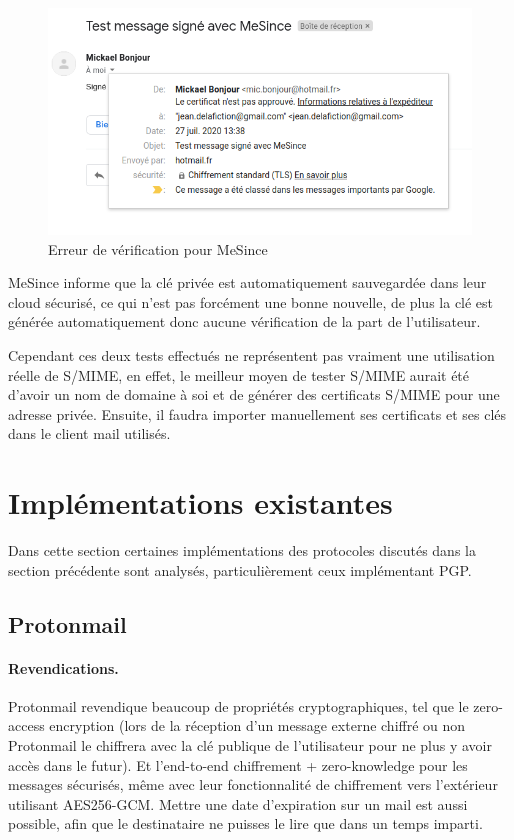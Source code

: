 \begin{figure}[h!]
	\includegraphics[width=15cm]{images/mesince_problem.png}
	\centering
	\caption{Erreur de vérification pour MeSince}
	\label{fig:SMIME_MeSinceProblem}
\end{figure}

MeSince informe que la clé privée est automatiquement sauvegardée dans leur cloud sécurisé, ce qui n'est pas forcément une bonne nouvelle, de plus la clé est générée automatiquement donc aucune vérification de la part de l'utilisateur.

Cependant ces deux tests effectués ne représentent pas vraiment une utilisation réelle de S/MIME, en effet, le meilleur moyen de tester S/MIME aurait été d'avoir un nom de domaine à soi et de générer des certificats S/MIME pour une adresse privée. Ensuite, il faudra importer manuellement ses certificats et ses clés dans le client mail utilisés.
\section{Implémentations existantes}
Dans cette section certaines implémentations des protocoles discutés dans la section précédente sont analysés, particulièrement ceux implémentant PGP.
\subsection{Protonmail}
\paragraph*{Revendications.}
Protonmail revendique beaucoup de propriétés cryptographiques, tel que le zero-access encryption (lors de la réception d'un message externe chiffré ou non Protonmail le chiffrera avec la clé publique de l'utilisateur pour ne plus y avoir accès dans le futur). Et l’end-to-end chiffrement + zero-knowledge pour les messages sécurisés, même avec leur fonctionnalité de chiffrement vers l'extérieur utilisant AES256-GCM. Mettre une date d'expiration sur un mail est aussi possible, afin que le destinataire ne puisses le lire que dans un temps imparti.


